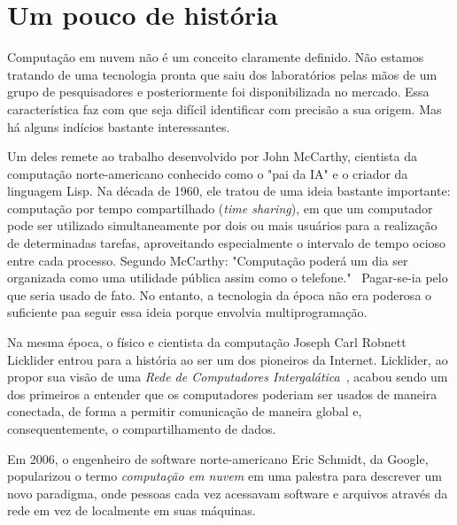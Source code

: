 \section{Um pouco de história}

Computação em nuvem não é um conceito claramente definido. Não estamos tratando de
uma tecnologia pronta que saiu dos laboratórios pelas mãos de um grupo de
pesquisadores e posteriormente foi disponibilizada no mercado. Essa característica
faz com que seja difícil identificar com precisão a sua origem. Mas há alguns
indícios bastante interessantes.

Um deles remete ao trabalho desenvolvido por John McCarthy, cientista da computação 
norte-americano conhecido como o "pai da IA" e o criador da linguagem Lisp. Na 
década de 1960, ele tratou de uma ideia bastante importante: computação por tempo 
compartilhado (\emph{time sharing}), em que um computador pode ser utilizado 
simultaneamente por dois ou mais usuários para a realização de determinadas tarefas, 
aproveitando especialmente o intervalo de tempo ocioso entre cada processo. Segundo 
McCarthy: "Computação poderá um dia ser organizada como uma utilidade pública assim 
como o telefone."~\cite{meersman2010move} Pagar-se-ia pelo que seria usado de fato. 
No entanto, a tecnologia da época não era poderosa o suficiente paa seguir essa 
ideia porque envolvia multiprogramação.

Na mesma época, o físico e cientista da computação Joseph Carl Robnett Licklider 
entrou para a história ao ser um dos pioneiros da Internet. Licklider, ao propor sua 
visão de uma \emph{Rede de Computadores 
Intergalática}~\cite{computerweekly-history-cloud-computing}, acabou sendo um dos 
primeiros a entender que os computadores poderiam ser usados de maneira conectada, 
de forma a permitir comunicação de maneira global e, consequentemente, o 
compartilhamento de dados.

Em 2006, o engenheiro de software norte-americano Eric Schmidt, da Google, 
popularizou o termo \emph{computação em nuvem} em uma palestra 
\cite{google-eric-schmidt} para descrever um novo paradigma, onde pessoas cada vez 
acessavam software e arquivos através da rede em vez de localmente em suas máquinas.

